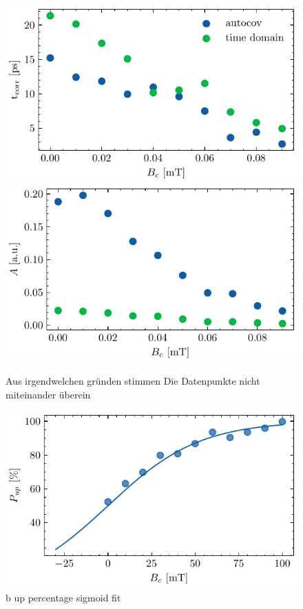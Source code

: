 \documentclass[main.tex]{subfiles}
\begin{document}
\begin{figure}[H]
    \centering
    \includegraphics{bilder/plots/max_Bz/t_corr.pdf}
    \includegraphics{bilder/plots/max_Bz/amplitude_corr.pdf}
    \caption{Aus irgendwelchen gründen stimmen Die Datenpunkte nicht miteinander überein }\label{fig:bz-autocorr-amplitude}
\end{figure}

\begin{figure}[H]
    \centering
    \includegraphics{bilder/plots/max_Bz/up_percentage_fit.pdf}
    \caption{b up percentage sigmoid fit }\label{fig:bz-up-percentage}
\end{figure}
\end{document}
